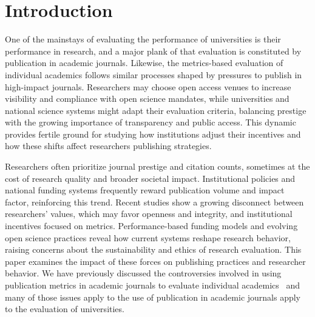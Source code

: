 \documentclass[amsfonts, amssymb, prl, superscriptaddress, notitlepage, twocolumn, nofootinbib]{revtex4-2}
\begin{document}
\maketitle 

\section{Introduction}
One of the mainstays of evaluating the performance of universities is their performance in research, and a major plank of that evaluation is constituted by publication in academic journals. Likewise, the metrics-based evaluation of individual academics follows similar processes shaped by pressures to publish in high-impact journals. Researchers may choose open access venues to increase visibility and compliance with open science mandates, while universities and national science systems might adapt their evaluation criteria, balancing prestige with the growing importance of transparency and public access. This dynamic provides fertile ground for studying how institutions adjust their incentives and how these shifts affect researchers publishing strategies.

Researchers often prioritize journal prestige and citation counts, sometimes at the cost of research quality and broader societal impact. Institutional policies and national funding systems frequently reward publication volume and impact factor, reinforcing this trend. Recent studies show a growing disconnect between researchers' values, which may favor openness and integrity, and institutional incentives focused on metrics. Performance-based funding models and evolving open science practices reveal how current systems reshape research behavior, raising concerns about the sustainability and ethics of research evaluation. This paper examines the impact of these forces on publishing practices and researcher behavior. We have previously discussed the controversies involved in using publication metrics in academic journals to evaluate individual academics~\cite{watson2023assessing} and many of those issues apply to the use of publication in academic journals apply to the evaluation of universities.
\end{document}

